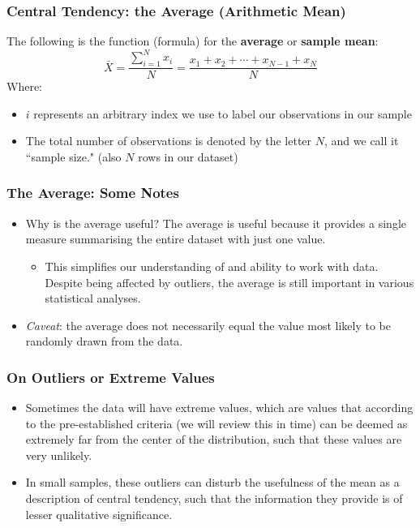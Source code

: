 \documentclass[handout]{beamer} %
\begin{document}
\begin{frame}
\frametitle{Central Tendency: the Average (Arithmetic Mean)}
The following is the function (formula) for the \textbf{average} or \textbf{sample mean}:
\begin{equation*}
\bar{X} = \frac{\sum_{i=1}^{N} x_i}{N} = \frac{x_1 + x_2 + \cdots + x_{N-1} + x_{N}}{N}
\end{equation*}
Where:
\begin{itemize}
    \item $i$ represents an arbitrary index we use to label our observations in our sample
    \item The total number of observations is denoted by the letter $N$, and we call it ``sample size." (also $N$ rows in our dataset)
\end{itemize}
\end{frame}

\begin{frame}
\frametitle{The Average: Some Notes}
\begin{itemize}
\item Why is the average useful? The average is useful because it provides a single measure summarising the entire dataset with just one value. 
\begin{itemize}
    \item This simplifies our understanding of and ability to work with data. Despite being affected by outliers, the average is still important in various statistical analyses.
\end{itemize}
\item \emph{Caveat}: the average does not necessarily equal the value most likely to be randomly drawn from the data.
\end{itemize}
\end{frame}

\begin{frame}
\frametitle{On Outliers or Extreme Values}
\begin{itemize}
\item Sometimes the data will have extreme values, which are values that according to the pre-established criteria (we will review this in time) can be deemed as extremely far from the center of the distribution, such that these values are very unlikely.
\item In small samples, these outliers can disturb the usefulness of the mean as a description of central tendency, such that the information they provide is of lesser qualitative significance.
\end{itemize}
\end{frame}
\end{document}
